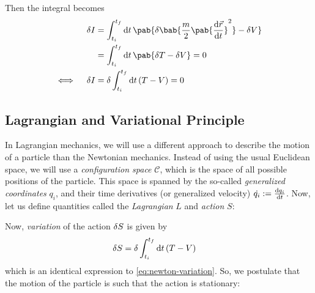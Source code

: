 Then the integral becomes
\begin{align}
  \fdif{I}            & = \int_{t_i}^{t_f} \odif{t} \, \pab{
    \delta \bab{\frac{m}{2} \pab{\odv{\vec{r}}{t}}^2}
    - \fdif{V}
  }                                                                                                   \\
                      & = \int_{t_i}^{t_f} \odif{t} \, \pab{
    \fdif{T} - \fdif{V}
  } = 0                                                                                               \\
  \iff \quad \fdif{I} & = \delta \int_{t_i}^{t_f} \odif{t} \, (T - V) = 0 \label{eq:newton-variation}
\end{align}
\cite{maeno-leastAction}

\subsection{Lagrangian and Variational Principle}
In Lagrangian mechanics, we will use a different approach to describe the motion of a particle than the Newtonian mechanics.
Instead of using the usual Euclidean space, we will use a \textit{configuration space} $\mathcal{C}$, which is the space of all possible positions of the particle.
This space is spanned by the so-called \emph{generalized coordinates} $q_i$, and their time derivatives (or generalized velocity) $\dot{q_i} := \odv{q_i}{t}$.
Now, let us define quantities called the \emph{Lagrangian} $L$ and \emph{action} $S$:

Now, \emph{variation} of the action $\fdif{S}$ is given by
\begin{align}
  \fdif{S} & = \delta \int_{t_i}^{t_f} \odif{t} \, (T - V)
\end{align}
which is an identical expression to \eqref{eq:newton-variation}.
So, we postulate that the motion of the particle is such that the action is stationary:

